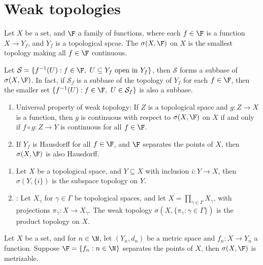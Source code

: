 \documentclass[a4paper]{article}
\begin{document}
\newpage

\section{Weak topologies}
Let $X$ be a set, and $\F$ a family of functions, where each $f\in\F$ is a function $X\to Y_f$, and $Y_f$ is a topological spcae. The  $\sigma(X,\F)$ on $X$ is the smallest topology making all $f\in\F$ continuous.

Let $\mathcal{S}=\{f^{-1}(U):f\in\F,\ U\subseteq Y_f\text{ open in }Y_f\}$, then $\mathcal{S}$ forms a subbase of $\sigma(X,\F)$. In fact, if $\mathcal{S}_f$ is a subbase of the topology of $Y_f$ for each $f\in\F$, then the smaller set $\{f^{-1}(U):f\in\F,\ U\in\mathcal{S}_f\}$ is also a subbase.

\begin{remark}
	\begin{enumerate}[label=(\arabic*)]
		\item Universal property of weak topology: If $Z$ is a topological space and $g:Z\to X$ is a function, then $g$ is continuous with respect to $\sigma(X,\F)$ on $X$ if and only if $f\circ g:Z\to Y$ is continuous for all $f\in\F$.
		\item If $Y_f$ is Hausdorff for all $f\in\F$, and $\F$ separates the points of $X$, then $\sigma(X,\F)$ is also Hausdorff.
	\end{enumerate}
\end{remark}

\begin{eg}
	\begin{enumerate}[label=(\arabic*)]
		\item Let $X$ be a topological space, and $Y\subseteq X$ with inclusion $i:Y\to X$, then $\sigma(Y,\{i\})$ is the subspace topology on $Y$.
		\item {}: Let $X_\gamma$ for $\gamma\in\Gamma$ be topological spaces, and let $X=\prod_{\gamma\in\Gamma}X_\gamma$, with projections $\pi_\gamma:X\to X_\gamma$. The weak topology $\sigma(X,\{\pi_\gamma:\gamma\in\Gamma\})$ is the product topology on $X$.
	\end{enumerate}
\end{eg}

\begin{nprop}\label{prop:WeakMetrizable}
  Let $X$ be a set, and for $n\in\N$, let $(Y_n,d_n)$ be a metric space and $f_n:X\to Y_n$ a function. Suppose $\F=\{f_n:n\in\N\}$ separates the points of $X$, then $\sigma(X,\F)$ is metrizable.
\end{nprop}
\end{document}
